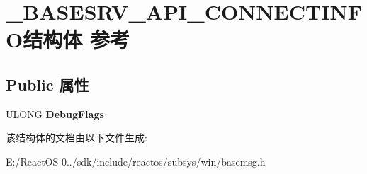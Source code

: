 \hypertarget{struct___b_a_s_e_s_r_v___a_p_i___c_o_n_n_e_c_t_i_n_f_o}{}\section{\+\_\+\+B\+A\+S\+E\+S\+R\+V\+\_\+\+A\+P\+I\+\_\+\+C\+O\+N\+N\+E\+C\+T\+I\+N\+F\+O结构体 参考}
\label{struct___b_a_s_e_s_r_v___a_p_i___c_o_n_n_e_c_t_i_n_f_o}
\subsection*{Public 属性}
\begin{DoxyCompactItemize}
\item 
\mbox{\label{struct___b_a_s_e_s_r_v___a_p_i___c_o_n_n_e_c_t_i_n_f_o_a85e010fb3bbab0e83b73aed60081ecf2}} 
U\+L\+O\+NG {\bfseries Debug\+Flags}
\end{DoxyCompactItemize}


该结构体的文档由以下文件生成\+:\begin{DoxyCompactItemize}
\item 
E\+:/\+React\+O\+S-\/0../sdk/include/reactos/subsys/win/basemsg.\+h\end{DoxyCompactItemize}
